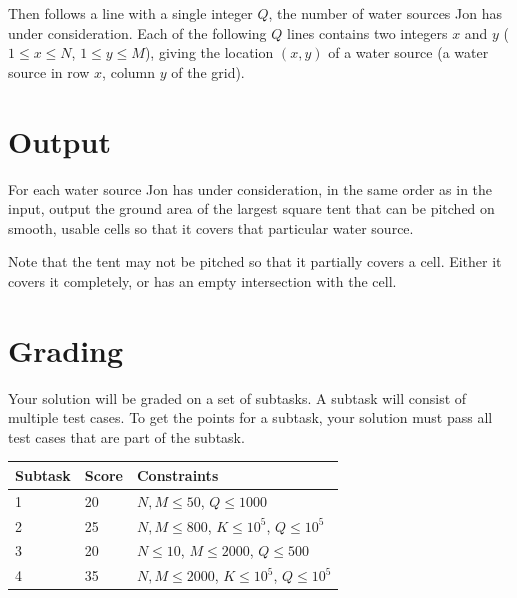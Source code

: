 Then follows a line with a single integer $Q$, the number of water sources Jon
has under consideration. Each of the following $Q$ lines contains two integers
$x$ and $y$ ($1 \leq x \leq N$, $1 \leq y \leq M$), giving the location $(x,y)$
of a water source (a water source in row $x$, column $y$ of the grid).


\section*{Output}
For each water source Jon has under consideration, in the same order as in the
input, output the ground area of the largest square tent that can be pitched
on smooth, usable cells so that it covers that particular water source.

Note that the tent may not be pitched so that it partially covers a cell.
Either it covers it completely, or has an empty intersection with the cell.

\section*{Grading}
Your solution will be graded on a set of subtasks. A subtask will consist of
multiple test cases. To get the points for a subtask, your solution must pass
all test cases that are part of the subtask.

\noindent
\begin{tabular}{| l | l | l |}
  \hline
  Subtask & Score & Constraints \\ \hline
  1 & 20 & $N,M \leq 50$, $Q\leq 1000$ \\ \hline
  2 & 25 & $N,M \leq 800$, $K\leq 10^5$, $Q\leq 10^5$ \\ \hline
  3 & 20 & $N\leq 10$, $M \leq 2000$, $Q\leq 500$ \\ \hline
  4 & 35 & $N,M \leq 2000$, $K\leq 10^5$, $Q\leq 10^5$ \\ \hline
\end{tabular}

